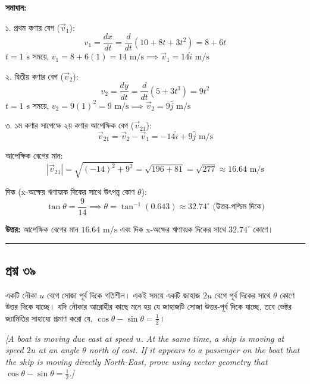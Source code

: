 \documentclass[11pt,a4paper]{article}
\begin{document}
\textbf{সমাধান:}

১. প্রথম কণার বেগ ($\vec{v}_1$):
$$v_1 = \frac{dx}{dt} = \frac{d}{dt}(10 + 8t + 3t^2) = 8 + 6t$$
$t = 1\text{ s}$ সময়ে, $v_1 = 8 + 6(1) = 14\text{ m/s} \implies \vec{v}_1 = 14\hat{i}\text{ m/s}$

২. দ্বিতীয় কণার বেগ ($\vec{v}_2$):
$$v_2 = \frac{dy}{dt} = \frac{d}{dt}(5 + 3t^3) = 9t^2$$
$t = 1\text{ s}$ সময়ে, $v_2 = 9(1)^2 = 9\text{ m/s} \implies \vec{v}_2 = 9\hat{j}\text{ m/s}$

৩. ১ম কণার সাপেক্ষে ২য় কণার আপেক্ষিক বেগ ($\vec{v}_{21}$):
$$\vec{v}_{21} = \vec{v}_2 - \vec{v}_1 = -14\hat{i} + 9\hat{j}\text{ m/s}$$

আপেক্ষিক বেগের মান:
$$|\vec{v}_{21}| = \sqrt{(-14)^2 + 9^2} = \sqrt{196 + 81} = \sqrt{277} \approx 16.64\text{ m/s}$$

দিক (x-অক্ষের ঋণাত্মক দিকের সাথে উৎপন্ন কোণ $\theta$):
$$\tan\theta = \frac{9}{14} \implies \theta = \tan^{-1}(0.643) \approx 32.74^\circ\text{ (উত্তর-পশ্চিম দিকে)}$$

\textbf{উত্তর:} আপেক্ষিক বেগের মান $16.64\text{ m/s}$ এবং দিক x-অক্ষের ঋণাত্মক দিকের সাথে $32.74^\circ$ কোণে।

\vspace{0.5cm}
\hrule
\vspace{0.5cm}

\subsection*{প্রশ্ন ৩৯}

একটি নৌকা $u$ বেগে সোজা পূর্ব দিকে গতিশীল। একই সময়ে একটি জাহাজ $2u$ বেগে পূর্ব দিকের সাথে $\theta$ কোণে উত্তর দিকে যাচ্ছে। যদি নৌকার আরোহীর কাছে মনে হয় যে জাহাজটি সোজা উত্তর-পূর্ব দিকে যাচ্ছে, তবে ভেক্টর জ্যামিতির সাহায্যে প্রমাণ করো যে, $\cos\theta - \sin\theta = \frac{1}{2}$।

\smallskip
\textit{[A boat is moving due east at speed $u$. At the same time, a ship is moving at speed $2u$ at an angle $\theta$ north of east. If it appears to a passenger on the boat that the ship is moving directly North-East, prove using vector geometry that $\cos\theta - \sin\theta = \frac{1}{2}$.]}

\vspace{0.3cm}
\begin{center}
\end{center}
\end{document}
